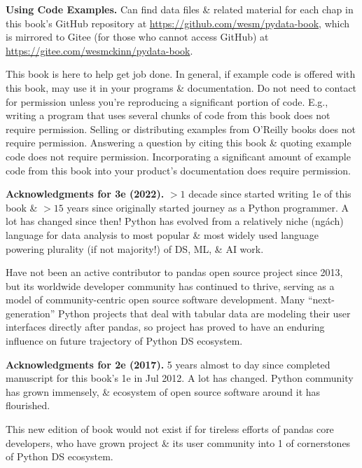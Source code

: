 \documentclass{article}
\begin{document}
\begin{enumerate}
	{\bf Using Code Examples.} Can find data files \& related material for each chap in this book's GitHub repository at \url{https://github.com/wesm/pydata-book}, which is mirrored to Gitee (for those who cannot access GitHub) at \url{https://gitee.com/wesmckinn/pydata-book}.
	
	This book is here to help get job done. In general, if example code is offered with this book, may use it in your programs \& documentation. Do not need to contact for permission unless you're reproducing a significant portion of code. E.g., writing a program that uses several chunks of code from this book does not require permission. Selling or distributing examples from O'Reilly books does not require permission. Answering a question by citing this book \& quoting example code does not require permission. Incorporating a significant amount of example code from this book into your product's documentation does require permission.
	
	{\bf Acknowledgments for 3e (2022).} $> 1$ decade since started writing 1e of this book \& $> 15$ years since originally started journey as a Python programmer. A lot has changed since then! Python has evolved from a relatively niche (ngách) language for data analysis to most popular \& most widely used language powering plurality (if not majority!) of DS, ML, \& AI work.
	
	Have not been an active contributor to pandas open source project since 2013, but its worldwide developer community has continued to thrive, serving as a model of community-centric open source software development. Many ``next-generation'' Python projects that deal with tabular data are modeling their user interfaces directly after pandas, so project has proved to have an enduring influence on future trajectory of Python DS ecosystem.
	
	{\bf Acknowledgments for 2e (2017).} 5 years almost to day since completed manuscript for this book's 1e in Jul 2012. A lot has changed. Python community has grown immensely, \& ecosystem of open source software around it has flourished.
	
	This new edition of book would not exist if for tireless efforts of pandas core developers, who have grown project \& its user community into 1 of cornerstones of Python DS ecosystem.
	

\end{enumerate}
\end{document}
